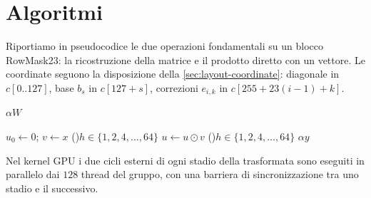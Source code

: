 \section{Algoritmi}

Riportiamo in pseudocodice le due operazioni fondamentali su un blocco RowMask23: la ricostruzione della matrice e il prodotto diretto con un vettore. Le coordinate seguono la disposizione della \autoref{sec:layout-coordinate}: diagonale in $c[0..127]$, base $b_s$ in $c[127+s]$, correzioni $e_{i,k}$ in $c[255+23(i-1)+k]$.

\begin{algorithm}[H]
\caption{Ricostruzione di un blocco RowMask23}
\Return $\alpha W$\;
\end{algorithm}

\begin{algorithm}[H]
\caption{Prodotto diretto $y=Wx$ senza ricostruzione}
$u_0\leftarrow0$; 
$v\leftarrow x$\;
\For(){$h\in\{1,2,4,\dots,64\}$}{
}
$u\leftarrow u\odot v$\;
\For(){$h\in\{1,2,4,\dots,64\}$}{
}
\Return $\alpha y$\;
\end{algorithm}

Nel kernel GPU i due cicli esterni di ogni stadio della trasformata sono eseguiti in parallelo dai $128$ thread del gruppo, con una barriera di sincronizzazione tra uno stadio e il successivo.

